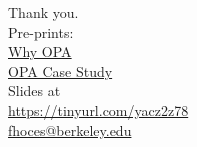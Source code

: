 \documentclass{beamer}
\def\blue{\color{blue}}
\newcommand{\backupbegin}{
   \newcounter{finalframe}
   \setcounter{finalframe}{\value{framenumber}}
}
\newcommand{\backupend}{
   \setcounter{framenumber}{\value{finalframe}}
}
\begin{document}
\begin{frame}[noframenumbering]
\begin{center}
\vspace*{6em}
{\LARGE Thank you.\\}
\bigskip
{\small
Pre-prints:\\
{\blue \href{https://osf.io/preprints/bitss/jnyqh}{Why OPA} } \\
{\blue \href{https://osf.io/preprints/bitss/ba7tr/}{OPA Case Study}  } \\
\medskip
Slides at \\
{\blue \href{https://tinyurl.com/yacz2z78}{https://tinyurl.com/yacz2z78}  }
\bigskip \\
\href{mailto:fhoces@berkeley.edu}{fhoces@berkeley.edu}
}
\end{center}
\end{frame}

\end{document}
